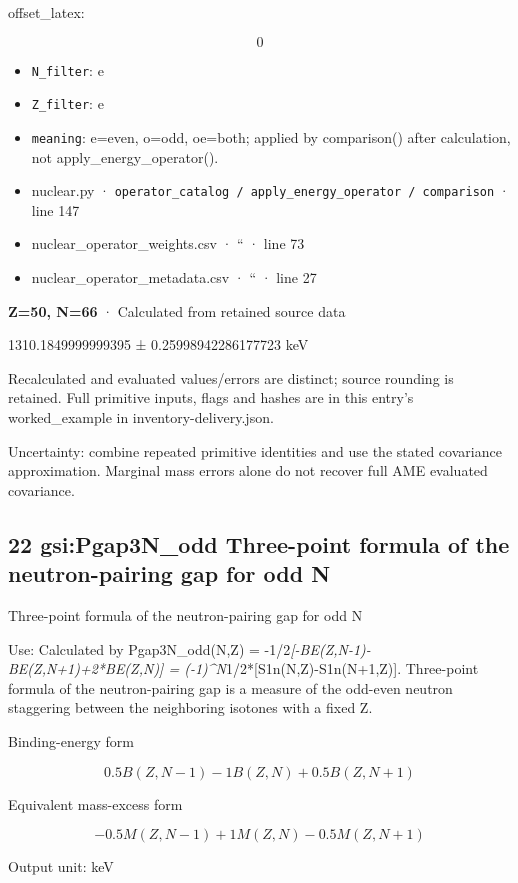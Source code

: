 \documentclass[
  11pt,
  letterpaper,
]{article}
\begin{document}
offset\_latex:

\[
0
\]

\begin{itemize}
\item
  \texttt{N\_filter}: e
\item
  \texttt{Z\_filter}: e
\item
  \texttt{meaning}: e=even, o=odd, oe=both; applied by comparison()
  after calculation, not apply\_energy\_operator().
\item
  nuclear.py ·
  \texttt{operator\_catalog\ /\ apply\_energy\_operator\ /\ comparison}
  · line 147
\item
  nuclear\_operator\_weights.csv · `` · line 73
\item
  nuclear\_operator\_metadata.csv · `` · line 27
\end{itemize}

\textbf{Z=50, N=66} · Calculated from retained source data

1310.1849999999395 ± 0.25998942286177723 keV

Recalculated and evaluated values/errors are distinct; source rounding
is retained. Full primitive inputs, flags and hashes are in this entry's
worked\_example in inventory-delivery.json.

Uncertainty: combine repeated primitive identities and use the stated
covariance approximation. Marginal mass errors alone do not recover full
AME evaluated covariance.

\subsection{22 gsi:Pgap3N\_odd Three-point formula of the
neutron-pairing gap for odd
N}\label{gsipgap3n_odd-three-point-formula-of-the-neutron-pairing-gap-for-odd-n}

Three-point formula of the neutron-pairing gap for odd N

Use: Calculated by Pgap3N\_odd(N,Z) =
-1/2\emph{{[}-BE(Z,N-1)-BE(Z,N+1)+2*BE(Z,N){]} =
(-1)\^{}N}1/2*{[}S1n(N,Z)-S1n(N+1,Z){]}. Three-point formula of the
neutron-pairing gap is a measure of the odd-even neutron staggering
between the neighboring isotones with a fixed Z.

Binding-energy form

\[
0.5B(Z,N-1)-1B(Z,N)+0.5B(Z,N+1)
\]

Equivalent mass-excess form

\[
-0.5M(Z,N-1)+1M(Z,N)-0.5M(Z,N+1)
\]

Output unit: keV
\end{document}
